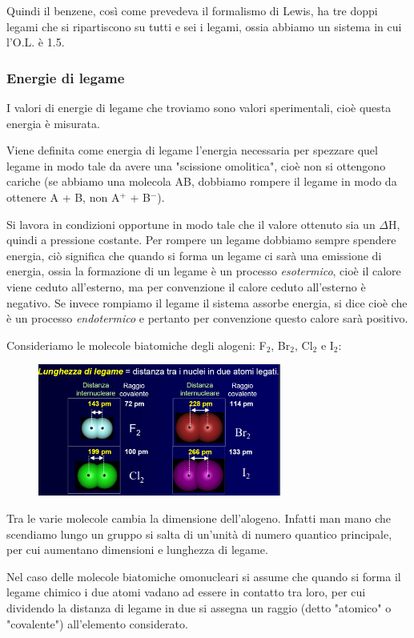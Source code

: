 Quindi il benzene, così come prevedeva il formalismo di Lewis, ha tre doppi legami che si ripartiscono su tutti e sei i legami, ossia abbiamo un sistema in cui l'O.L. è 1.5.
\subsubsection{Energie di legame}

I valori di energie di legame che troviamo sono valori sperimentali, cioè questa energia è misurata.

Viene definita come energia di legame l'energia necessaria per spezzare quel legame in modo tale da avere una "scissione omolitica", cioè non si ottengono cariche (se abbiamo una molecola AB, dobbiamo rompere il legame in modo da ottenere A + B, non A$^+$ + B$^-$).

Si lavora in condizioni opportune in modo tale che il valore ottenuto sia un $\Delta$H, quindi a pressione costante. Per rompere un legame dobbiamo sempre spendere energia, ciò significa  che quando si forma un legame ci sarà una emissione di energia, ossia la formazione di un legame è un processo \textit{esotermico}, cioè il calore viene ceduto all'esterno, ma per convenzione il calore ceduto all'esterno è negativo. Se invece rompiamo il legame il sistema assorbe energia, si dice cioè che è un processo \textit{endotermico} e pertanto per convenzione questo calore sarà positivo.

Consideriamo le molecole biatomiche degli alogeni: F$_2$, Br$_2$, Cl$_2$ e I$_2$:

\begin{figure}[htp]
    \centering
    \includegraphics[width=8cm]{immagini/molecole_biatomiche_alogeni.png}
\end{figure}

Tra le varie molecole cambia la dimensione dell'alogeno. Infatti man mano che scendiamo lungo un gruppo si salta di un'unità di numero quantico principale, per cui aumentano dimensioni e lunghezza di legame.

Nel caso delle molecole biatomiche omonucleari si assume che quando si forma il legame chimico i due atomi vadano ad essere in contatto tra loro, per cui dividendo la distanza di legame in due si assegna un raggio (detto "atomico" o "covalente") all'elemento considerato.

